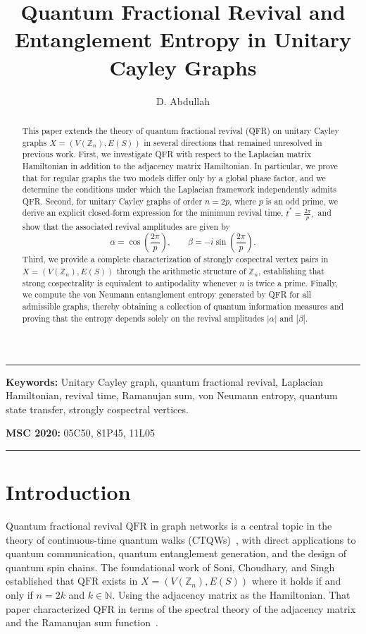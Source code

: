\documentclass[12pt]{amsart}
\author{D. Abdullah}
\title[Quantum Fractional Revival]{Quantum Fractional Revival and Entanglement Entropy in Unitary Cayley Graphs}
\date{}
\newcommand{\QFR}{\mathrm{QFR}}
\begin{document}
\begin{abstract}
This paper extends the theory of quantum fractional revival (QFR) on unitary Cayley graphs
$X=(V(\mathbb{Z}_n),E(S))$ in several directions that remained unresolved in previous work.
First, we investigate QFR with respect to the Laplacian matrix Hamiltonian in addition to the
adjacency matrix Hamiltonian. In particular, we prove that for regular graphs the two models
differ only by a global phase factor, and we determine the conditions under which the Laplacian
framework independently admits QFR.
Second, for unitary Cayley graphs of order $n=2p$, where $p$ is an odd prime, we derive an
explicit closed-form expression for the minimum revival time,
$t^{*}=\frac{2\pi}{p},$
and show that the associated revival amplitudes are given by
\[
\alpha=\cos\!\left(\frac{2\pi}{p}\right), \qquad
\beta=-i\sin\!\left(\frac{2\pi}{p}\right).
\]
Third, we provide a complete characterization of strongly cospectral vertex pairs in
$X=(V(\mathbb{Z}_n),E(S))$ through the arithmetic structure of $\mathbb{Z}_n$, establishing that
strong cospectrality is equivalent to antipodality whenever $n$ is twice a prime.
Finally, we compute the von Neumann entanglement entropy generated by QFR for all admissible
graphs, thereby obtaining a collection of quantum information measures and proving that the
entropy depends solely on the revival amplitudes $|\alpha|$ and $|\beta|$.

\end{abstract}
\maketitle


\noindent\rule{15.9cm}{1.0pt}

\noindent
\textbf{
Keywords:} Unitary Cayley graph, quantum fractional revival, Laplacian Hamiltonian,
revival time, Ramanujan sum, von Neumann entropy, quantum state transfer, strongly cospectral
vertices.


\medskip

\noindent
{\bf
MSC 2020:} 05C50, 81P45, 11L05\\[0.3em]



\noindent\rule{15.9cm}{1.0pt}

\section{Introduction}
Quantum fractional revival $\QFR$ in graph networks is a central topic in the theory of
continuous-time quantum walks (CTQWs)~\cite{genest2016,bernard2018}, with direct applications to quantum communication,
quantum entanglement generation, and the design of quantum spin chains. The foundational
work of Soni, Choudhary, and Singh~\cite{soni2025original} established that $\QFR$ exists in
 $X = (V(\mathbb{Z}_n), E(S))$ where it holds if and only if $n=2k$ and $k\in \mathbb{N}$. Using the adjacency matrix as the Hamiltonian. That paper characterized QFR in terms of
the spectral theory of the adjacency matrix and the Ramanujan sum function~\cite{chan2019, chan2022fundamentals, chan2021laplacian}.
\end{document}
